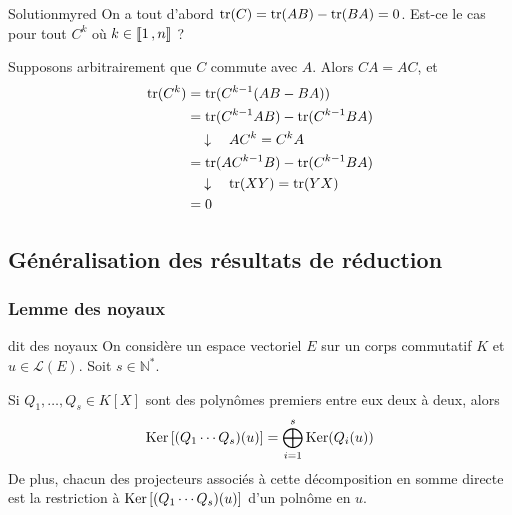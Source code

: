     \begin{demo}{Solution}{myred}
        On a tout d’abord $\operatorname{tr}(C) = \operatorname{tr}(AB) - \operatorname{tr}(BA) = 0$. Est-ce le cas pour tout $C^k$ où $k \in \left\llbracket 1 \, , n \right\rrbracket$ ? 

        Supposons arbitrairement que $C$ commute avec $A$. Alors $CA = AC$, et
        \begin{align*}
            \operatorname{tr}(C^k) 
            &= \operatorname{tr}(C^{k-1}(AB - BA)) \\
            &= \operatorname{tr}(C^{k-1} AB) - \operatorname{tr}(C^{k-1} BA) \\
            &\quad \downarrow \quad A C^k = C^k A \\
            &= \operatorname{tr}(A C^{k-1} B) - \operatorname{tr}(C^{k-1} BA) \\ 
            &\quad \downarrow \quad \operatorname{tr}(XY) = \operatorname{tr}(YX) \\
            &= 0
        \end{align*} 
    \end{demo}

\subsection{Généralisation des résultats de réduction}

    \subsubsection{Lemme des noyaux}

    \begin{lem}{dit des noyaux}{}
        On considère un espace vectoriel $E$ sur un corps commutatif $K$ et $u \in \mathcal{L}(E)$. Soit $s \in \mathbb{N}^*$.

        Si $Q_1,\ldots,Q_s \in K[X]$ sont des polynômes premiers entre eux deux à deux, alors 
        \[ \operatorname{Ker}\left[(Q_1\cdots Q_s)(u)\right] = \bigoplus_{i=1}^s \operatorname{Ker}(Q_i(u)) \]
        De plus, chacun des projecteurs associés à cette décomposition en somme directe est la restriction à $\operatorname{Ker}\left[(Q_1\cdots Q_s)(u)\right]$ d’un polnôme en $u$.
    \end{lem}

